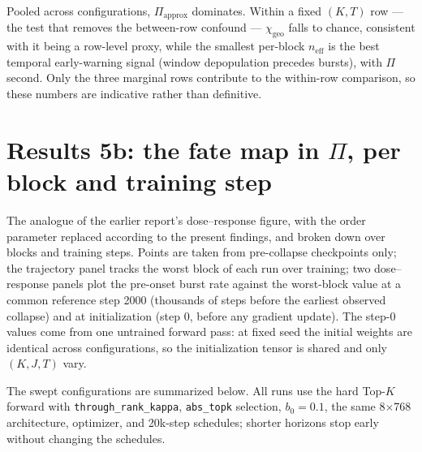 \documentclass[11pt,a4paper]{article}
\newcommand{\code}[1]{\texttt{#1}}
\newcommand{\neff}{n_{\mathrm{eff}}}
\newcommand{\chigeo}{\chi_{\mathrm{geo}}}
\begin{document}
Pooled across configurations, \(\Pi_{\mathrm{approx}}\) dominates. Within a
fixed \((K,T)\) row --- the test that removes the between-row confound ---
\(\chigeo\) falls to chance, consistent with it being a row-level proxy,
while the smallest per-block \(\neff\) is the best temporal early-warning
signal (window depopulation precedes bursts), with \(\Pi\) second. Only the
three marginal rows contribute to the within-row comparison, so these
numbers are indicative rather than definitive.




\section{Results 5b: the fate map in \texorpdfstring{$\Pi$}{Pi}, per block and training step}

The analogue of the earlier report's dose--response figure, with the order
parameter replaced according to the present findings, and broken down over
blocks and training steps. Points are taken from pre-collapse checkpoints
only; the trajectory panel tracks the worst block of each run over
training; two dose--response panels plot the pre-onset burst rate against
the worst-block value at a common reference step 2000 (thousands of steps
before the earliest observed collapse) and at initialization (step 0,
before any gradient update). The step-0 values come from one untrained
forward pass: at fixed seed the initial weights are identical across
configurations, so the initialization tensor is shared and only
\((K, J, T)\) vary.

The swept configurations are summarized below. All runs use the hard
Top-\(K\) forward with \code{through\_rank\_kappa}, \code{abs\_topk}
selection, \(b_0 = 0.1\), the same 8\(\times\)768 architecture, optimizer,
and 20k-step schedules; shorter horizons stop early without changing the
schedules.
\end{document}
